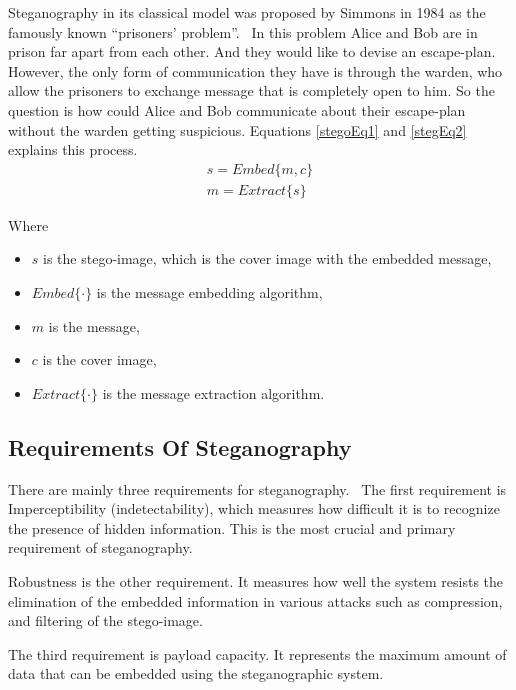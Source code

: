\documentclass[../main/main.tex]{subfiles}
\begin{document}
	Steganography in its classical model was proposed by Simmons in 1984 as the famously known \textquotedblleft prisoners' problem\textquotedblright.~\cite{simmons1984prisoners} In this problem Alice and Bob are in prison far apart from each other. And they would like to devise an escape-plan. However, the only form of communication they have is through the warden, who allow the prisoners to exchange message that is completely open to him. So the question is how could Alice and Bob communicate about their escape-plan without the warden getting suspicious. Equations \ref{stegoEq1} and \ref{stegEq2} explains this process. 
	\begin{align}
	\label{stegoEq1}
	s = Embed\{m, c\} \\
	\label{stegEq2} 
	m = Extract\{s\}
	\end{align}
	
	Where
	\begin{itemize}
		\item $s$ is the stego-image, which is the cover image with the embedded message,
		\item $Embed\{ \cdot\}$ is the message embedding algorithm,
		\item $m$ is the message,
		\item $c$ is the cover image,
		\item $Extract\{\cdot\}$ is the message extraction algorithm.
	\end{itemize}
	 
	\subsection{Requirements Of Steganography} \label{reqStego}
	There are mainly three requirements for steganography.~\cite{Yahya2018} The first requirement is Imperceptibility (indetectability), which measures how difficult it is to recognize the presence of hidden information. This is the most crucial and primary requirement of steganography.~\cite{chen2012capacity} 
	
	Robustness is the other requirement. It measures how well the system resists the elimination of the embedded information in various attacks such as compression, and filtering of the stego-image.~\cite{bahi2012steganography}
	
	The third requirement is payload capacity. It represents the maximum amount of data that can be embedded using the steganographic system.
	
	
\end{document}
